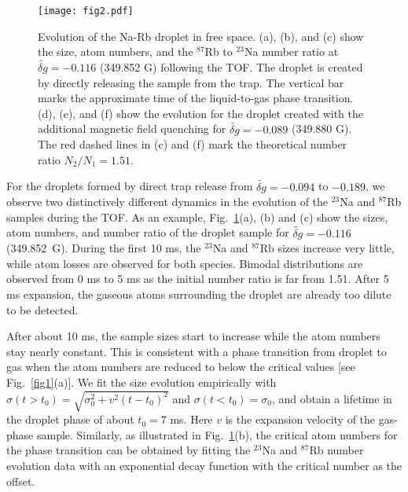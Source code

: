 \begin{figure}[htb]
\begin{center}
\texttt{[image: fig2.pdf]}
\end{center}
\caption[Evolution of the Na-Rb droplet in free space]{Evolution of the Na-Rb droplet in free space. (a), (b), and (c) show the size, atom numbers, and the $^{87}$Rb to $^{23}$Na number ratio at $\widetilde{\delta g} = -0.116$ (349.852 G) following the TOF. The droplet is created by directly releasing the sample from the trap. The vertical bar marks the approximate time of the liquid-to-gas phase transition. (d), (e), and (f) show the evolution for the droplet created with the additional magnetic field quenching for $\widetilde{\delta g} = -0.089$ (349.880 G). The red dashed lines in (c) and (f) mark the theoretical number ratio $N_2/N_1=1.51$.}  
\label{fig2}
\end{figure}

For the droplets formed by direct trap release from $\widetilde{\delta g} = -0.094$ to $-0.189$, we observe two distinctively different dynamics in the evolution of the $^{23}$Na and $^{87}$Rb samples during the TOF. As an example, Fig.~\ref{fig2}(a), (b) and (c) show the sizes, atom numbers, and number ratio of the droplet sample for $\widetilde{\delta g}=-0.116$ (349.852~G).
During the first 10 ms, the $^{23}$Na and $^{87}$Rb sizes increase very little, while atom losses are observed for both species.
Bimodal distributions are observed from 0 ms to 5 ms as the initial number ratio is far from 1.51. After 5 ms expansion, the gaseous atoms surrounding the droplet are already too dilute to be detected. 

After about 10 ms, the sample sizes start to increase while the atom numbers stay nearly constant.
This is consistent with a phase transition from droplet to gas when the atom numbers are reduced to below the critical values [see Fig.~\ref{fig1}(a)]. We fit the size evolution empirically with $\sigma(t>t_0)=\sqrt{\sigma_0^2+v^2(t-t_0)^2}$ and $\sigma(t<t_0)=\sigma_0$, and obtain a lifetime in the droplet phase of about $t_0 = 7$ ms. Here $v$ is the expansion velocity of the gas-phase sample. Similarly, as illustrated in Fig.~\ref{fig2}(b), the critical atom numbers for the phase transition can be obtained by fitting the $^{23}$Na and $^{87}$Rb number evolution data with an 
exponential decay function with the critical number as the offset.

